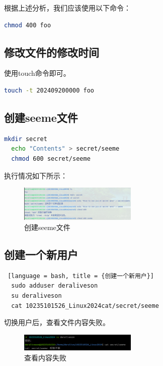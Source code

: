 \documentclass[14pt,a4paper,UTF8,twoside]{article}
\begin{document}
根据上述分析，我们应该使用以下命令：

\begin{lstlisting}[language = bash, title = {对目标文件进行权限修改}]
  chmod 400 foo
\end{lstlisting}

\subsection{修改文件的修改时间}

使用touch命令即可。

\begin{lstlisting}[language = bash, title = {修改文件的修改时间}]
  touch -t 202409200000 foo
\end{lstlisting}

\subsection{创建seeme文件}

\begin{lstlisting}[language = bash, title = {创建seeme文件}]
  mkdir secret
  echo "Contents" > secret/seeme
  chmod 600 secret/seeme
\end{lstlisting}

执行情况如下所示：

\begin{figure}[H]
  \centering
  \includegraphics[width=0.5\textwidth]{lec2/chmod.png}
  \caption{创建seeme文件}
  \label{fig:4}
\end{figure}

\subsection{创建一个新用户}

\begin{lstlisting} [language = bash, title = {创建一个新用户}]
  sudo adduser deraliveson
  su deraliveson
  cat 10235101526_Linux2024cat/secret/seeme
\end{lstlisting}

切换用户后，查看文件内容失败。

\begin{figure} [H]
  \centering
  \includegraphics[width=0.5\textwidth]{lec2/deraliveson.png}
  \caption{查看内容失败}
  \label{fig:5}
\end{figure}
\end{document}
